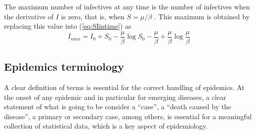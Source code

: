 The maximum number of infectives at any time is the number of infectives when the derivative of $I$ is zero, that is, when $S = \mu /\beta$ . This maximum is obtained by replacing this value into (\ref{eq:SIintime}) as
\[ I_{max} =  I_0 +S_0 - \frac \mu\beta \log S_0  - \frac \mu\beta +\frac \mu\beta \log \frac{\mu}{\beta} 
\]

\subsection{Epidemics terminology}

A clear definition of terms is essential for the correct handling of epidemics. At the onset of any epidemic and in particular for emerging diseases, a clear statement of what is going to be consider a ``case'', a ``death caused by the disease'', a primary or secondary case, among others, is essential for a meaningful collection of statistical data, which is a key aspect of epidemiology.

